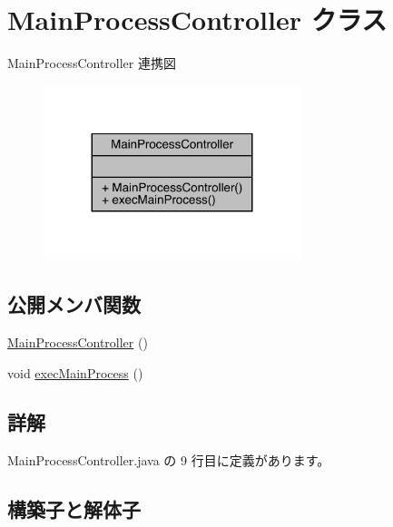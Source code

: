\hypertarget{class_main_process_controller}{}\section{Main\+Process\+Controller クラス}
\label{class_main_process_controller}


Main\+Process\+Controller 連携図
\nopagebreak
\begin{figure}[H]
\begin{center}
\leavevmode
\includegraphics[width=212pt]{df/dc7/class_main_process_controller__coll__graph}
\end{center}
\end{figure}
\subsection*{公開メンバ関数}
\begin{DoxyCompactItemize}
\item 
\mbox{\hyperlink{class_main_process_controller_af422b069cc9f6cadb45a64ef985bd536}{Main\+Process\+Controller}} ()
\item 
void \mbox{\hyperlink{class_main_process_controller_ac92bd6b23aa4c17913d6a9c63ee72739}{exec\+Main\+Process}} ()
\end{DoxyCompactItemize}


\subsection{詳解}


 Main\+Process\+Controller.\+java の 9 行目に定義があります。



\subsection{構築子と解体子}
\mbox{\label{class_main_process_controller_af422b069cc9f6cadb45a64ef985bd536}} 
